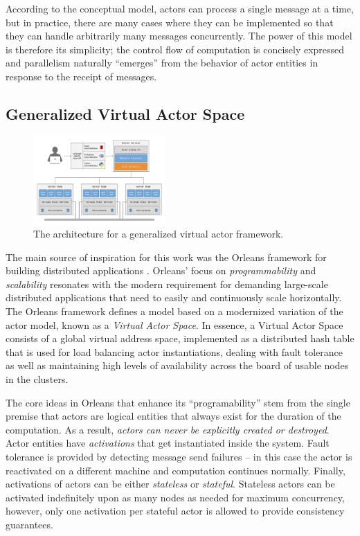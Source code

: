 \documentclass[conference,twocolumn,10pt]{IEEEtran}
\begin{document}
According to the conceptual model, actors can process a single message at a time, but in practice, there are many cases where they can be implemented so that they can handle arbitrarily many messages concurrently. The power of this model is therefore its simplicity; the control flow of computation is concisely expressed and parallelism naturally ``emerges'' from the behavior of actor entities in response to the receipt of messages.

\subsection{Generalized Virtual Actor Space}

\begin{figure}[!t]
    \centering
    \includegraphics[width=0.45\textwidth]{architecture}
    \caption{The architecture for a generalized virtual actor framework.}
    \label{fig:architecture}
\end{figure}

The main source of inspiration for this work was the Orleans framework for building distributed applications \cite{bernstein_orleans:_2014}. Orleans' focus on \textit{programmability} and \textit{scalability} resonates with the modern requirement for demanding large-scale distributed applications that need to easily and continuously scale horizontally. The Orleans framework defines a model based on a modernized variation of the actor model, known as a \textit{Virtual Actor Space}. In essence, a Virtual Actor Space consists of a global virtual address space, implemented as a distributed hash table that is used for load balancing actor instantiations, dealing with fault tolerance as well as maintaining high levels of availability across the board of usable nodes in the clusters.

The core ideas in Orleans that enhance its ``programability'' stem from the single premise that actors are logical entities that always exist for the duration of the computation. As a result, \textit{actors can never be explicitly created or destroyed}. Actor entities have \textit{activations} that get instantiated inside the system. Fault tolerance is provided by detecting message send failures -- in this case the actor is reactivated on a different machine and computation continues normally. Finally, activations of actors can be either \textit{stateless} or \textit{stateful}. Stateless actors can be activated indefinitely upon as many nodes as needed for maximum concurrency, however, only one activation per stateful actor is allowed to provide consistency guarantees.
\end{document}
